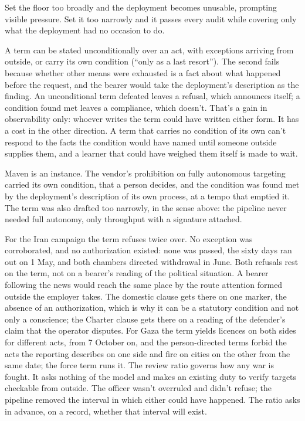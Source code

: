 
Set the floor too broadly and the deployment becomes unusable, prompting visible pressure. Set it too narrowly and it passes every audit while covering only what the deployment had no occasion to do.


A term can be stated unconditionally over an act, with exceptions arriving from outside, or carry its own condition (“only as a last resort”). The second fails because whether other means were exhausted is a fact about what happened before the request, and the bearer would take the deployment's description as the finding. An unconditional term defeated leaves a refusal, which announces itself; a condition found met leaves a compliance, which doesn't. That's a gain in observability only: whoever writes the term could have written either form. It has a cost in the other direction. A term that carries no condition of its own can't respond to the facts the condition would have named until someone outside supplies them, and a learner that could have weighed them itself is made to wait.

Maven is an instance. The vendor's prohibition on fully autonomous targeting carried its own condition, that a person decides, and the condition was found met by the deployment's description of its own process, at a tempo that emptied it. The term was also drafted too narrowly, in the sense above: the pipeline never needed full autonomy, only throughput with a signature attached.


For the Iran campaign the term refuses twice over. No exception was corroborated, and no authorization existed: none was passed, the sixty days ran out on 1 May, and both chambers directed withdrawal in June. Both refusals rest on the term, not on a bearer's reading of the political situation. A bearer following the news would reach the same place by the route attention formed outside the employer takes. The domestic clause gets there on one marker, the absence of an authorization, which is why it can be a statutory condition and not only a conscience; the Charter clause gets there on a reading of the defender's claim that the operator disputes. For Gaza the term yields licences on both sides for different acts, from 7 October on, and the person-directed terms forbid the acts the reporting describes on one side and fire on cities on the other from the same date; the force term runs it. The review ratio governs how any war is fought. It asks nothing of the model and makes an existing duty to verify targets checkable from outside. The officer wasn't overruled and didn't refuse; the pipeline removed the interval in which either could have happened. The ratio asks in advance, on a record, whether that interval will exist.

